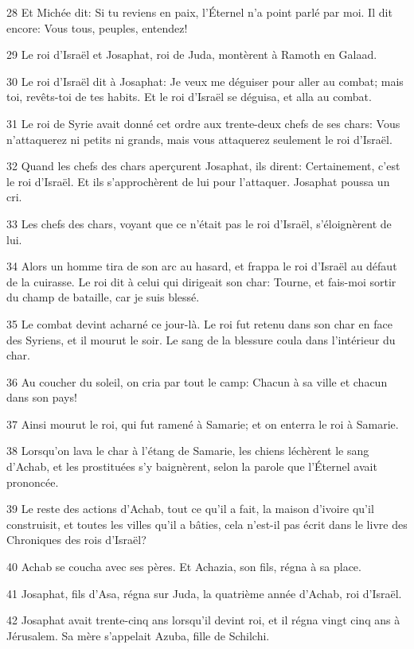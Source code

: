 \par 28 Et Michée dit: Si tu reviens en paix, l'Éternel n'a point parlé par moi. Il dit encore: Vous tous, peuples, entendez!
\par 29 Le roi d'Israël et Josaphat, roi de Juda, montèrent à Ramoth en Galaad.
\par 30 Le roi d'Israël dit à Josaphat: Je veux me déguiser pour aller au combat; mais toi, revêts-toi de tes habits. Et le roi d'Israël se déguisa, et alla au combat.
\par 31 Le roi de Syrie avait donné cet ordre aux trente-deux chefs de ses chars: Vous n'attaquerez ni petits ni grands, mais vous attaquerez seulement le roi d'Israël.
\par 32 Quand les chefs des chars aperçurent Josaphat, ils dirent: Certainement, c'est le roi d'Israël. Et ils s'approchèrent de lui pour l'attaquer. Josaphat poussa un cri.
\par 33 Les chefs des chars, voyant que ce n'était pas le roi d'Israël, s'éloignèrent de lui.
\par 34 Alors un homme tira de son arc au hasard, et frappa le roi d'Israël au défaut de la cuirasse. Le roi dit à celui qui dirigeait son char: Tourne, et fais-moi sortir du champ de bataille, car je suis blessé.
\par 35 Le combat devint acharné ce jour-là. Le roi fut retenu dans son char en face des Syriens, et il mourut le soir. Le sang de la blessure coula dans l'intérieur du char.
\par 36 Au coucher du soleil, on cria par tout le camp: Chacun à sa ville et chacun dans son pays!
\par 37 Ainsi mourut le roi, qui fut ramené à Samarie; et on enterra le roi à Samarie.
\par 38 Lorsqu'on lava le char à l'étang de Samarie, les chiens léchèrent le sang d'Achab, et les prostituées s'y baignèrent, selon la parole que l'Éternel avait prononcée.
\par 39 Le reste des actions d'Achab, tout ce qu'il a fait, la maison d'ivoire qu'il construisit, et toutes les villes qu'il a bâties, cela n'est-il pas écrit dans le livre des Chroniques des rois d'Israël?
\par 40 Achab se coucha avec ses pères. Et Achazia, son fils, régna à sa place.
\par 41 Josaphat, fils d'Asa, régna sur Juda, la quatrième année d'Achab, roi d'Israël.
\par 42 Josaphat avait trente-cinq ans lorsqu'il devint roi, et il régna vingt cinq ans à Jérusalem. Sa mère s'appelait Azuba, fille de Schilchi.
